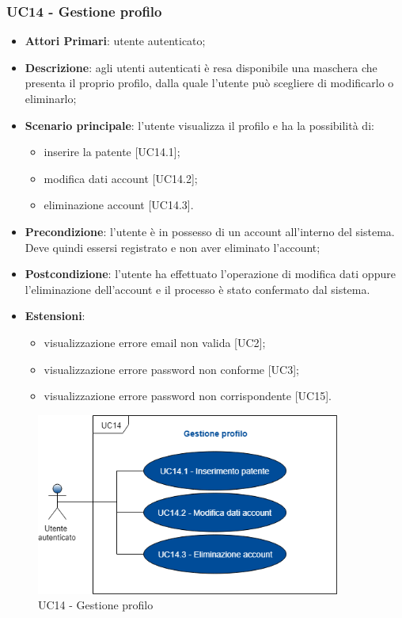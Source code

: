 \subsubsection{UC14 - Gestione profilo}
\begin{itemize}
	\item \textbf{Attori Primari}: utente autenticato;
	\item \textbf{Descrizione}: agli utenti autenticati è resa disponibile una maschera che presenta il proprio profilo, dalla quale l'utente può scegliere di modificarlo o eliminarlo;
	\item \textbf{Scenario principale}: l'utente visualizza il profilo e ha la possibilità di: 
	\begin{itemize}
		\item inserire la patente [UC14.1];
		\item modifica dati account [UC14.2];
		\item eliminazione account [UC14.3].
	\end{itemize}
	\item \textbf{Precondizione}: l'utente è in possesso di un account all'interno del sistema. Deve quindi essersi registrato e non aver eliminato l'account;
	\item \textbf{Postcondizione}: l'utente ha effettuato l'operazione di modifica dati oppure l'eliminazione dell'account e il processo è stato confermato dal sistema.
	\item \textbf{Estensioni}:
	\begin{itemize}
		\item visualizzazione errore email non valida [UC2];
		\item visualizzazione errore password non conforme [UC3];
		\item visualizzazione errore password non corrispondente [UC15].
	\end{itemize}
\end{itemize}
\begin{figure}[h]
	\includegraphics[width=10cm]{res/images/UC14Profilo.png}
	\centering
	\caption{UC14 - Gestione profilo}
\end{figure}
